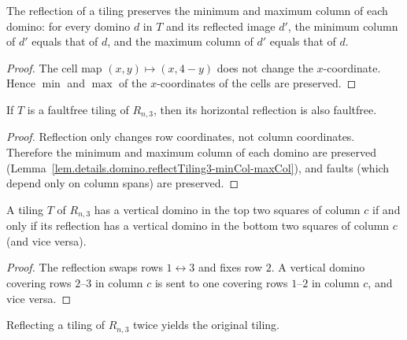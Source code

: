 \begin{lemma}
\label{lem.details.domino.reflectTiling3-minCol-maxCol}
\leanhelper
\leanok
The reflection of a tiling preserves the minimum and maximum column
of each domino: for every domino $d$ in $T$ and its reflected image $d'$,
the minimum column of $d'$ equals that of $d$, and the maximum column
of $d'$ equals that of $d$.
\end{lemma}

\begin{proof}
\leanok
The cell map $(x, y) \mapsto (x, 4-y)$ does not change the $x$-coordinate.
Hence $\min$ and $\max$ of the $x$-coordinates of the cells are preserved.
\end{proof}

\begin{lemma}
\label{lem.details.domino.reflectTiling3-faultfree}
\leanhelper
\leanok
If $T$ is a faultfree tiling of $R_{n,3}$, then its horizontal reflection
is also faultfree.
\end{lemma}

\begin{proof}
\leanok
Reflection only changes row coordinates, not column coordinates.
Therefore the minimum and maximum column of each domino are
preserved (Lemma~\ref{lem.details.domino.reflectTiling3-minCol-maxCol}),
and faults (which depend only on column spans) are preserved.
\end{proof}

\begin{lemma}
\label{lem.details.domino.reflectTiling3-top-bottom}
\leanhelper
\leanok
A tiling $T$ of $R_{n,3}$ has a vertical domino in the top two squares
of column $c$ if and only if its reflection has a vertical domino in the
bottom two squares of column $c$ (and vice versa).
\end{lemma}

\begin{proof}
\leanok
The reflection swaps rows $1 \leftrightarrow 3$ and fixes row $2$.
A vertical domino covering rows $2$--$3$ in column $c$ is sent to one
covering rows $1$--$2$ in column $c$, and vice versa.
\end{proof}

\begin{lemma}
\label{lem.details.domino.reflectTiling3-involutive}
\leanhelper
\leanok
Reflecting a tiling of $R_{n,3}$ twice yields the original tiling.
\end{lemma}


